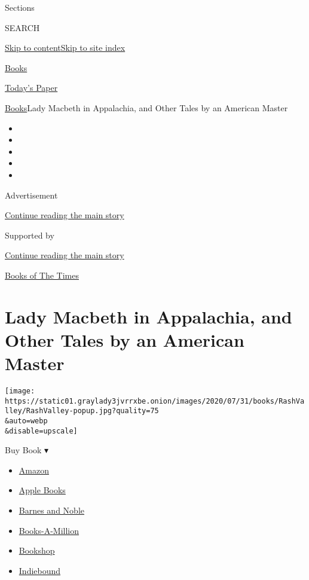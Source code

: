 Sections

SEARCH

\protect\hyperlink{site-content}{Skip to
content}\protect\hyperlink{site-index}{Skip to site index}

\href{https://www.nytimes3xbfgragh.onion/section/books}{Books}

\href{https://myaccount.nytimes3xbfgragh.onion/auth/login?response_type=cookie\&client_id=vi}{}

\href{https://www.nytimes3xbfgragh.onion/section/todayspaper}{Today's
Paper}

\href{/section/books}{Books}\textbar{}Lady Macbeth in Appalachia, and
Other Tales by an American Master

\begin{itemize}
\item
\item
\item
\item
\item
\end{itemize}

Advertisement

\protect\hyperlink{after-top}{Continue reading the main story}

Supported by

\protect\hyperlink{after-sponsor}{Continue reading the main story}

\href{/column/books-of-the-times}{Books of The Times}

\hypertarget{lady-macbeth-in-appalachia-and-other-tales-by-an-american-master}{%
\section{Lady Macbeth in Appalachia, and Other Tales by an American
Master}\label{lady-macbeth-in-appalachia-and-other-tales-by-an-american-master}}

\texttt{[image: https://static01.graylady3jvrrxbe.onion/images/2020/07/31/books/RashValley/RashValley-popup.jpg?quality=75\\\&auto=webp\\\&disable=upscale]}

Buy Book ▾

\begin{itemize}
\tightlist
\item
  \href{https://www.amazon.com/gp/search?index=books\&tag=NYTBSREV-20\&field-keywords=In+the+Valley+Ron+Rash}{Amazon}
\item
  \href{https://du-gae-books-dot-nyt-du-prd.appspot.com/buy?title=In+the+Valley\&author=Ron+Rash}{Apple
  Books}
\item
  \href{https://www.anrdoezrs.net/click-7990613-11819508?url=https\%3A\%2F\%2Fwww.barnesandnoble.com\%2Fw\%2F\%3Fean\%3D9780385544290}{Barnes
  and Noble}
\item
  \href{https://www.anrdoezrs.net/click-7990613-35140?url=https\%3A\%2F\%2Fwww.booksamillion.com\%2Fp\%2FIn\%2Bthe\%2BValley\%2FRon\%2BRash\%2F9780385544290}{Books-A-Million}
\item
  \href{https://bookshop.org/a/3546/9780385544290}{Bookshop}
\item
  \href{https://www.indiebound.org/book/9780385544290?aff=NYT}{Indiebound}
\end{itemize}

